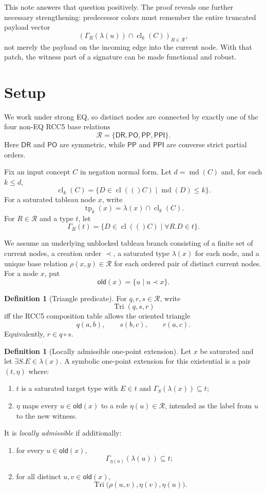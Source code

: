 \documentclass[11pt]{article}
\theoremstyle{definition}
\newtheorem{definition}[theorem]{Definition}
\newcommand{\Roles}{\mathcal{R}}
\newcommand{\DR}{\mathsf{DR}}
\newcommand{\PO}{\mathsf{PO}}
\newcommand{\PP}{\mathsf{PP}}
\newcommand{\PPI}{\mathsf{PPI}}
\newcommand{\cl}[1]{\operatorname{cl}(#1)}
\newcommand{\cld}[2]{\operatorname{cl}_{#1}(#2)}
\newcommand{\md}{\operatorname{md}}
\newcommand{\tp}{\operatorname{tp}}
\newcommand{\Tri}{\operatorname{Tri}}
\newcommand{\older}{\mathsf{old}}
\begin{document}
This note answers that question positively. The proof reveals one further necessary strengthening: predecessor colors must remember the entire truncated payload vector
\[
(\Gamma_R(\lambda(u))\cap \cld{k}{C})_{R\in\Roles},
\]
not merely the payload on the incoming edge into the current node. With that patch, the witness part of a signature can be made functional and robust.

\section{Setup}

We work under strong EQ, so distinct nodes are connected by exactly one of the four non-EQ RCC5 base relations
\[
\Roles=\{\DR,\PO,\PP,\PPI\}.
\]
Here $\DR$ and $\PO$ are symmetric, while $\PP$ and $\PPI$ are converse strict partial orders.

Fix an input concept $C$ in negation normal form. Let $d=\md(C)$ and, for each $k\le d$,
\[
\cld{k}{C}=\{D\in \cl(C)\mid \md(D)\le k\}.
\]
For a saturated tableau node $x$, write
\[
\tp_k(x)=\lambda(x)\cap \cld{k}{C}.
\]
For $R\in\Roles$ and a type $t$, let
\[
\Gamma_R(t)=\{D\in \cl(C)\mid \forall R.D\in t\}.
\]

We assume an underlying unblocked tableau branch consisting of a finite set of current nodes, a creation order $\prec$, a saturated type $\lambda(x)$ for each node, and a unique base relation $\rho(x,y)\in\Roles$ for each ordered pair of distinct current nodes. For a node $x$, put
\[
\older(x)=\{u\mid u\prec x\}.
\]

\begin{definition}[Triangle predicate]
For $q,r,s\in\Roles$, write
\[
\Tri(q,s,r)
\]
iff the RCC5 composition table allows the oriented triangle
\[
q(a,b),\qquad s(b,c),\qquad r(a,c).
\]
Equivalently, $r\in q\circ s$.
\end{definition}

\begin{definition}[Locally admissible one-point extension]
Let $x$ be saturated and let $\exists S.E\in\lambda(x)$. A symbolic one-point extension for this existential is a pair $(t,\eta)$ where:
\begin{enumerate}[label=(\alph*)]
  \item $t$ is a saturated target type with $E\in t$ and $\Gamma_S(\lambda(x))\subseteq t$;
  \item $\eta$ maps every $u\in\older(x)$ to a role $\eta(u)\in\Roles$, intended as the label from $u$ to the new witness.
\end{enumerate}
It is \emph{locally admissible} if additionally:
\begin{enumerate}[label=(\roman*)]
  \item for every $u\in\older(x)$,
  \[
  \Gamma_{\eta(u)}(\lambda(u))\subseteq t;
  \]
  \item for all distinct $u,v\in\older(x)$,
  \[
  \Tri\bigl(\rho(u,v),\eta(v),\eta(u)\bigr).
  \]
\end{enumerate}
\end{definition}
\end{document}
